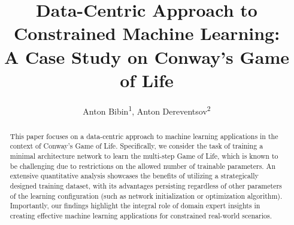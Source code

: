 \documentclass[letterpaper]{article} %
\begin{document}
\title{Data-Centric Approach to Constrained Machine Learning:\\A Case Study on Conway's Game of Life}
\author{
    Anton Bibin\textsuperscript{\rm 1},
    Anton Dereventsov\textsuperscript{\rm 2}
}
\maketitle

\begin{abstract}
This paper focuses on a data-centric approach to machine learning applications in the context of Conway's Game of Life.
Specifically, we consider the task of training a minimal architecture network to learn the multi-step Game of Life, which is known to be challenging due to restrictions on the allowed number of trainable parameters.
An extensive quantitative analysis showcases the benefits of utilizing a strategically designed training dataset, with its advantages persisting regardless of other parameters of the learning configuration (such as network initialization or optimization algorithm).
Importantly, our findings highlight the integral role of domain expert insights in creating effective machine learning applications for constrained real-world scenarios.
\end{abstract}


\end{document}
